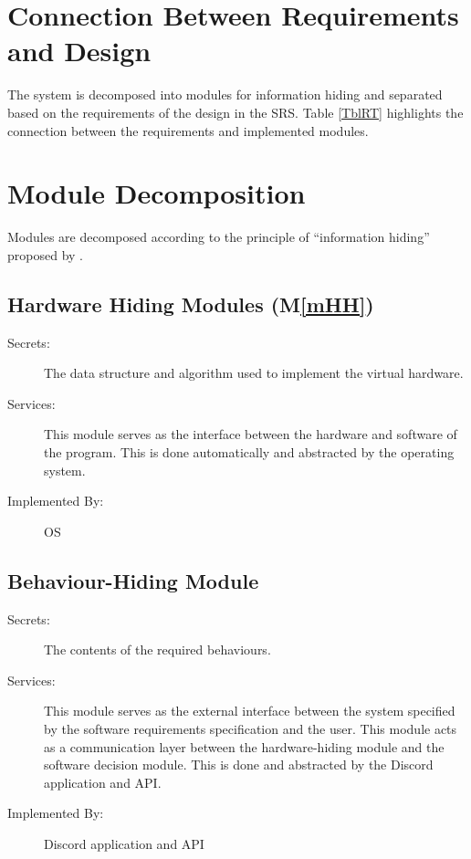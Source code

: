 \documentclass[12pt, titlepage]{article}
\newcommand{\mref}[1]{M\ref{#1}}
\begin{document}
\section{Connection Between Requirements and Design} \label{SecConnection}

The system is decomposed into modules for information hiding and separated based on the requirements of the design in the SRS. Table \ref{TblRT} highlights the connection between the requirements and implemented modules. 

\section{Module Decomposition} \label{SecMD}

Modules are decomposed according to the principle of ``information hiding''
proposed by \citet{ParnasEtAl1984}.

\subsection{Hardware Hiding Modules (\mref{mHH})}

\begin{description}
\item[Secrets:]The data structure and algorithm used to implement the virtual
  hardware.
\item[Services:]This module serves as the interface between the hardware and software of the program. This is done automatically and abstracted by the operating system.
\item[Implemented By:] OS
\end{description}

\subsection{Behaviour-Hiding Module}

\begin{description}
\item[Secrets:]The contents of the required behaviours.
\item[Services:]This module serves as the external interface between the system specified by the software requirements specification and the user. This module acts as a communication layer between the hardware-hiding module and the software decision module. This is done and abstracted by the Discord application and API. 
\item[Implemented By:] Discord application and API
\end{description}
\end{document}
